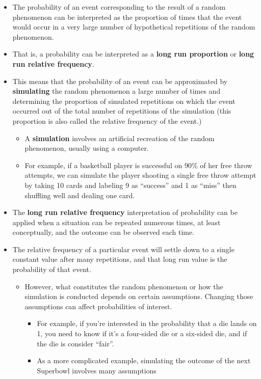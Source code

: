 \documentclass[
]{book}
\providecommand{\tightlist}{%
  \setlength{\itemsep}{0pt}\setlength{\parskip}{0pt}}
\theoremstyle{definition}
\theoremstyle{definition}
\theoremstyle{definition}
\theoremstyle{remark}
\begin{document}
\begin{itemize}
\tightlist
\item
  The probability of an event corresponding to the result of a random phenomenon can be interpreted as the proportion of times that the event would occur in a very large number of hypothetical repetitions of the random phenomenon.
\item
  That is, a probability can be interpreted as a \textbf{long run proportion} or \textbf{long run relative frequency}.
\item
  This means that the probability of an event can be approximated by \textbf{simulating} the random phenomenon a large number of times and determining the proportion of simulated repetitions on which the event occurred out of the total number of repetitions of the simulation (this proportion is also called the relative frequency of the event.)

  \begin{itemize}
  \tightlist
  \item
    A \textbf{simulation} involves an artificial recreation of the random phenomenon, usually using a computer.
  \item
    For example, if a basketball player is successful on 90\% of her free throw attempts, we can simulate the player shooting a single free throw attempt by taking 10 cards and labeling 9 as ``success'' and 1 as ``miss'' then shuffling well and dealing one card.
  \end{itemize}
\item
  The \textbf{long run relative frequency} interpretation of probability can be applied when a situation can be repeated numerous times, at least conceptually, and the outcome can be observed each time.
\item
  The relative frequency of a particular event will settle down to a single constant value after many repetitions, and that long run value is the probability of that event.

  \begin{itemize}
  \tightlist
  \item
    However, what constitutes the random phenomenon or how the simulation is conducted depends on certain assumptions. Changing those assumptions can affect probabilities of interest.

    \begin{itemize}
    \tightlist
    \item
      For example, if you're interested in the probability that a die lands on 1, you need to know if it's a four-sided die or a six-sided die, and if the die is consider ``fair''.
    \item
      As a more complicated example, simulating the outcome of the next Superbowl involves many assumptions
    \end{itemize}
  \end{itemize}
\end{itemize}
\end{document}
